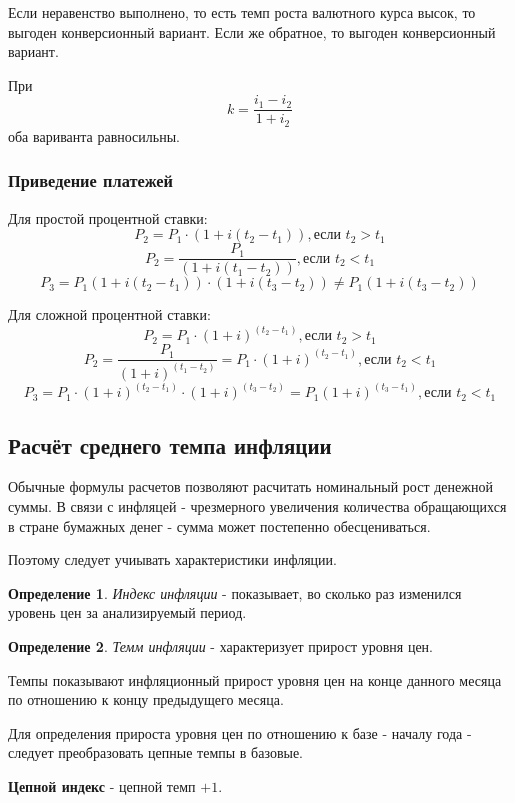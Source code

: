 \documentclass[aps,%
12pt,%
final,%
oneside,
onecolumn,%
musixtex, %
superscriptaddress,%
centertags]{article} %
\theoremstyle{plain}
\theoremstyle{definition}
\newtheorem{definition}{Определение}[subsection]
\theoremstyle{remark}
\begin{document}
Если неравенство выполнено, то есть темп роста валютного курса высок, то выгоден конверсионный вариант. Если же обратное, то выгоден конверсионный вариант.

При
$$k = \frac{i_1-i_2}{1+i_2}$$
оба вариванта равносильны.

\subsubsection{Приведение платежей}
Для простой процентной ставки:
$$ P_2 = P_1 \cdot (1 + i (t_2-t_1)), \text{если } t_2 > t_1 $$
$$ P_2 = \frac {P_1}{(1+i(t_1-t_2))}, \text{если } t_2 < t_1 $$
$$ P_3 = P_1 (1+i(t_2-t_1)) \cdot (1+i(t_3-t_2)) \neq P_1 (1+i(t_3-t_2))$$

Для сложной процентной ставки:
$$ P_2 = P_1 \cdot (1 + i)^{(t_2-t_1)}, \text{если } t_2 > t_1 $$
$$ P_2 = \frac{P_1}{(1+i)^{(t_1-t_2)}} = P_1 \cdot (1 + i)^{(t_2-t_1)}, \text{если } t_2 < t_1$$
$$ P_3 =P_1 \cdot (1 + i)^{(t_2-t_1)} \cdot (1 + i)^{(t_3-t_2)} = P_1 (1+i)^{(t_3-t_1)}, \text{если } t_2 < t_1$$


\subsection{Расчёт среднего темпа инфляции }

Обычные формулы расчетов позволяют расчитать номинальный рост денежной суммы. В связи с инфляцей - чрезмерного увеличения количества обращающихся в стране бумажных денег - сумма может постепенно обесцениваться. 

Поэтому следует учиывать характеристики инфляции.

\begin{definition}
	\textit{Индекс инфляции} - показывает, во сколько раз изменился уровень цен за анализируемый период.
\end{definition}
\begin{definition}
	\textit{Темм инфляции}  - характеризует прирост уровня цен.
\end{definition}

Темпы показывают инфляционный прирост уровня цен на конце данного месяца по отношению к концу предыдущего месяца.

Для определения прироста уровня цен по отношению к базе - началу года - следует преобразовать цепные темпы в базовые.

\textbf{Цепной индекс}  - цепной темп $+1$.
\end{document}
